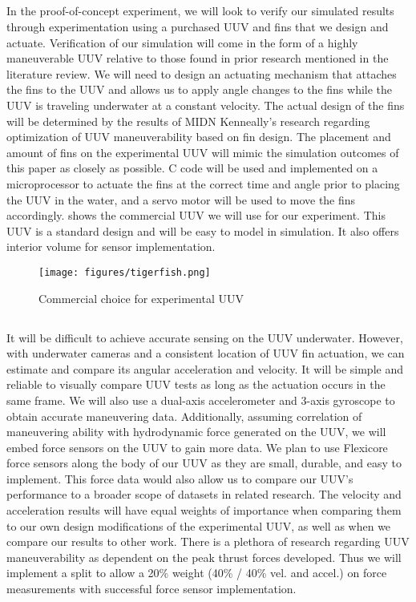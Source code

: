 \documentclass{IEEEtran}
\begin{document}
\subsection{}
In the proof-of-concept experiment, we will look to verify our simulated results through experimentation using a purchased UUV and fins that we design and actuate. Verification of our simulation will come in the form of a highly maneuverable UUV relative to those found in prior research mentioned in the literature review. We will need to design an actuating mechanism that attaches the fins to the UUV and allows us to apply angle changes to the fins while the UUV is traveling underwater at a constant velocity. The actual design of the fins will be determined by the results of MIDN Kenneally’s research regarding optimization of UUV maneuverability based on fin design. The placement and amount of fins on the experimental UUV will mimic the simulation outcomes of this paper as closely as possible. C code will be used and implemented on a microprocessor to actuate the fins at the correct time and angle prior to placing the UUV in the water, and a servo motor will be used to move the fins accordingly.  shows the commercial UUV we will use for our experiment. This UUV is a standard design and will be easy to model in simulation. It also offers interior volume for sensor implementation.
\begin{figure*}
\begin{center}
\texttt{[image: figures/tigerfish.png]}
\end{center}
\caption{Commercial choice for experimental UUV}
\label{fig:UUV}
\end{figure*}

\subsection{}
It will be difficult to achieve accurate sensing on the UUV underwater. However, with underwater cameras and a consistent location of UUV fin actuation, we can estimate and compare its angular acceleration and velocity. It will be simple and reliable to visually compare UUV tests as long as the actuation occurs in the same frame. We will also use a dual-axis accelerometer and 3-axis gyroscope to obtain accurate maneuvering data. Additionally, assuming correlation of maneuvering ability with hydrodynamic force generated on the UUV, we will embed force sensors on the UUV to gain more data. We plan to use Flexicore force sensors along the body of our UUV as they are small, durable, and easy to implement. This force data would also allow us to compare our UUV’s performance to a broader scope of datasets in related research. The velocity and acceleration results will have equal weights of importance when comparing them to our own design modifications of the experimental UUV, as well as when we compare our results to other work. There is a plethora of research regarding UUV maneuverability as dependent on the peak thrust forces developed. Thus we will implement a split to allow a 20\% weight (40\% / 40\% vel. and accel.) on force measurements with successful force sensor implementation.
\end{document}
